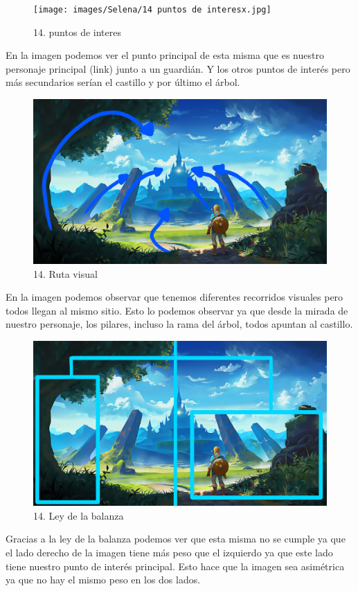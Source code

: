 \documentclass[12pt]{article}
\begin{document}
    \begin{figure}[H]
      \centering
      \texttt{[image: images/Selena/14 puntos de interesx.jpg]}
      \caption{\small 14. puntos de interes}
    \end{figure}
    En la imagen podemos ver el punto principal de esta misma que es nuestro personaje principal (link) junto a un guardián. Y los otros puntos de interés pero más secundarios serían el castillo y por último el árbol. 
    
    \begin{figure}[H]
      \centering
      \includegraphics[scale=0.35]{images/Selena/14 flechas.jpg}
      \caption{\small 14. Ruta visual}
    \end{figure}
    En la imagen podemos observar que tenemos diferentes recorridos visuales pero todos llegan al mismo sitio. Esto lo podemos observar ya que desde la mirada de nuestro personaje, los pilares, incluso la rama del árbol, todos apuntan al castillo. 


    \begin{figure}[H]
      \centering
      \includegraphics[scale=0.35]{images/Selena/14 balanza.jpg}
      \caption{\small 14. Ley de la balanza}
    \end{figure}
    Gracias a la ley de la balanza podemos ver que esta misma no se cumple ya que el lado derecho de la imagen tiene más peso que el izquierdo ya que este lado tiene nuestro punto de interés principal. Esto hace que la imagen sea asimétrica ya que no hay el mismo peso en los dos lados. 
\end{document}
